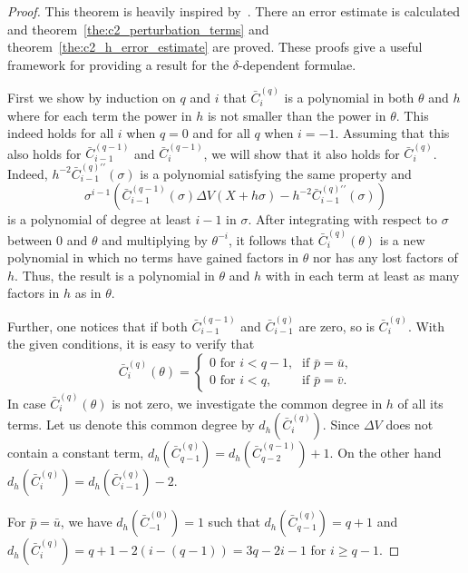\begin{proof}
    This theorem is heavily inspired by~\cite{ixaru_cp_1998}. There an error estimate is calculated and theorem~\ref{the:c2_perturbation_terms} and theorem~\ref{the:c2_h_error_estimate} are proved. These proofs give a useful framework for providing a result for the $\delta$-dependent formulae.

    First we show by induction on $q$ and $i$ that $\bar{C}_{i}^{(q)}$ is a polynomial in both $\theta$ and $h$ where for each term the power in $h$ is not smaller than the power in $\theta$. This indeed holds for all $i$ when $q=0$ and for all $q$ when $i=-1$. Assuming that this also holds for $\bar{C}_{i-1}^{(q-1)}$ and $\bar{C}_{i}^{(q-1)}$, we will show that it also holds for $\bar{C}_{i}^{(q)}$. Indeed, $h^{-2}\bar{C}_{i-1}^{(q)\prime\prime}(\sigma)$ is a polynomial satisfying the same property and
    $$
        \sigma^{i-1} \left(
        \bar{C}_{i-1}^{(q-1)}(\sigma) \Delta V(X+h\sigma) - h^{-2} \bar{C}_{i-1}^{(q)\prime\prime}(\sigma)
        \right)
    $$
    is a polynomial of degree at least $i-1$ in $\sigma$. After integrating with respect to $\sigma$ between $0$ and $\theta$ and multiplying by $\theta^{-i}$, it follows that $\bar{C}_{i}^{(q)}(\theta)$ is a new polynomial in which no terms have gained factors in $\theta$ nor has any lost factors of $h$. Thus, the result is a polynomial in $\theta$ and $h$ with in each term at least as many factors in $h$ as in $\theta$.

    Further, one notices that if both $\bar{C}_{i-1}^{(q-1)}$ and $\bar{C}_{i-1}^{(q)}$ are zero, so is $\bar{C}_{i}^{(q)}$. With the given conditions, it is easy to verify that
    $$
        \bar{C}_{i}^{(q)}(\theta) =  \begin{cases}
            \text{$0$ for $i <q -1$,} & \text{if $\bar{p} = \bar{u}$,} \\
            \text{$0$ for $i <q$,}    & \text{if $\bar{p} = \bar{v}$.}
        \end{cases}
    $$
    In case $\bar{C}_{i}^{(q)}(\theta)$ is not zero, we investigate the common degree in $h$ of all its terms. Let us denote this common degree by $d_h(\bar{C}_{i}^{(q)})$.  Since $\Delta V$ does not contain a constant term, $d_h\left(\bar{C}_{q-1}^{(q)}\right) = d_h\left(\bar{C}_{q-2}^{(q-1)}\right)+1$.
    On the other hand $d_h\left(\bar{C}_{i}^{(q)}\right)=d_h\left(\bar{C}_{i-1}^{(q)}\right)-2$.

    For $\bar{p}=\bar{u}$, we have $d_h\left(\bar{C}_{-1}^{(0)}\right)=1$ such that $d_h\left(\bar{C}_{q-1}^{(q)}\right)=q+1$ and $d_h\left(\bar{C}_{i}^{(q)}\right) = q+1-2(i-(q-1))=3q-2i-1$ for $i \geq q-1$.


\end{proof}
